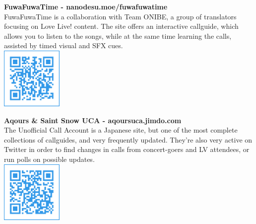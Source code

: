 \begin{changemargin}{0em}{9em}
\textbf{FuwaFuwaTime - \textcolor{aqours}{nanodesu.moe/fuwafuwatime}}\\
FuwaFuwaTime is a collaboration with Team ONIBE, a group of translators focusing on Love Live! content. The site offers an interactive callguide, which allows you to listen to the songs, while at the same time learning the calls, assisted by timed visual and SFX cues.
\vspace{-7.66em}\\
\hspace*{\linewidth}\hspace{1em}\includegraphics[height=8em,keepaspectratio]{images/qr_fuwafuwatime.pdf}

\textbf{Aqours \& Saint Snow UCA - \textcolor{aqours}{aqoursuca.jimdo.com}}\\
The Unofficial Call Account is a Japanese site, but one of the most complete collections of callguides, and very frequently updated. They're also very active on Twitter in order to find changes in calls from concert-goers and LV attendees, or run polls on possible updates.
\vspace{-7.66em}\\
\hspace*{\linewidth}\hspace{1em}\includegraphics[height=8em,keepaspectratio]{images/qr_aqoursuca.pdf}
\end{changemargin}
\vspace{\fill}

\ifdefined\COMPLETE
\else
	
\fi